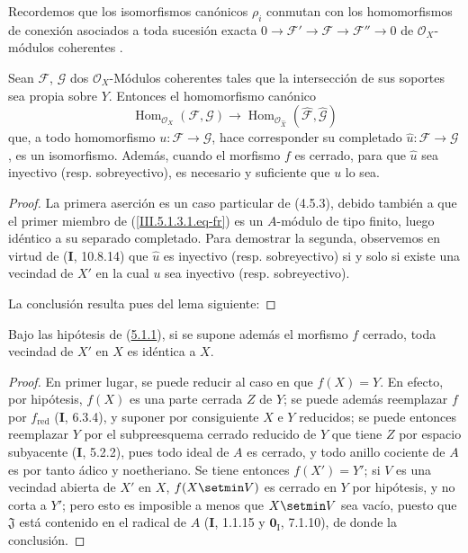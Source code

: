 Recordemos que los isomorfismos canónicos $\rho_i$ conmutan con los
homomorfismos de conexión asociados a toda sucesión exacta
$0\to\mathcal F'\to\mathcal F\to\mathcal F''\to0$
de $\mathcal O_X$-módulos coherentes
 .

\begin{corollary}[5.1.3]
\label{III.5.1.3-fr}
Sean $\mathcal F$, $\mathcal G$ dos $\mathcal O_X$-Módulos coherentes tales que
la intersección de sus soportes sea propia sobre $Y$. Entonces el homomorfismo canónico
\begin{equation}
\operatorname{Hom}_{\mathcal O_X}(\mathcal F,\mathcal G)
\longrightarrow
\operatorname{Hom}_{\mathcal O_{\widehat X}}
(\widehat{\mathcal F},\widehat{\mathcal G})
\tag{5.1.3.1}
\label{III.5.1.3.1.eq-fr}
\end{equation}
que, a todo homomorfismo $u:\mathcal F\to\mathcal G$, hace corresponder su
completado $\widehat u:\mathcal F\to\mathcal G$, es un
isomorfismo. Además, cuando el morfismo $f$ es cerrado, para que $\widehat u$ sea
inyectivo (\textup{resp.} sobreyectivo), es necesario y suficiente que $u$ lo sea.
\end{corollary}

\begin{proof}
La primera aserción es un caso particular de (4.5.3), debido también a que el
primer miembro de (\ref{III.5.1.3.1.eq-fr}) es un $A$-módulo de tipo finito, luego
idéntico a su separado completado. Para demostrar la segunda, observemos en virtud de
(\textbf{I}, 10.8.14) que $\widehat u$ es inyectivo (resp. sobreyectivo) si y solo si existe
una vecindad de $X'$ en la cual $u$ sea inyectivo (resp. sobreyectivo).

La conclusión
resulta pues del lema siguiente:
\end{proof}

\begin{lemma}[5.1.3.1]
\label{III.5.1.3.1-fr}
Bajo las hipótesis de \textup{(\hyperref[III.5.1.1-fr]{5.1.1})}, si se supone además el
morfismo $f$ cerrado, toda vecindad de $X'$ en $X$ es idéntica a $X$.
\end{lemma}

\begin{proof}
En primer lugar, se puede reducir al caso en que $f(X)=Y$. En efecto, por hipótesis,
$f(X)$ es una parte cerrada $Z$ de $Y$; se puede además reemplazar $f$ por
$f_{\mathrm{red}}$ (\textbf{I}, 6.3.4), y suponer por consiguiente $X$ e $Y$ reducidos; se puede entonces
reemplazar $Y$ por el subpreesquema cerrado reducido de $Y$ que tiene $Z$ por espacio
subyacente (\textbf{I}, 5.2.2), pues todo ideal de $A$ es cerrado, y todo anillo cociente de
$A$ es por tanto ádico y noetheriano. Se tiene entonces $f(X')=Y'$; si $V$ es una vecindad
abierta de $X'$ en $X$, $f(X\setmin V)$ es cerrado en $Y$ por hipótesis, y no corta
a $Y'$; pero esto es imposible a menos que $X\setmin V$ sea vacío, puesto que
$\mathfrak J$ está contenido en el radical de $A$ (\textbf{I}, 1.1.15 y $\mathbf{0}_{\mathrm I}$,
7.1.10), de donde la conclusión.
\end{proof}

